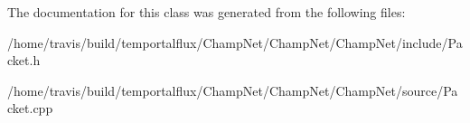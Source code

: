 The documentation for this class was generated from the following files\-:\begin{DoxyCompactItemize}
\item 
/home/travis/build/temportalflux/\-Champ\-Net/\-Champ\-Net/\-Champ\-Net/include/Packet.\-h\item 
/home/travis/build/temportalflux/\-Champ\-Net/\-Champ\-Net/\-Champ\-Net/source/Packet.\-cpp\end{DoxyCompactItemize}
